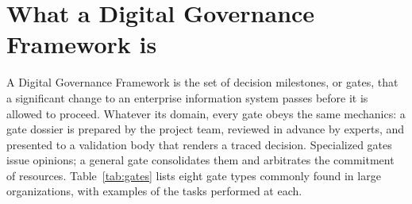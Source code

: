\section{What a Digital Governance Framework is}
\label{sec:dgf}

A Digital Governance Framework is the set of decision milestones, or gates, that a significant change
to an enterprise information system passes before it is allowed to proceed. Whatever its domain, every
gate obeys the same mechanics: a gate dossier is prepared by the project team, reviewed in advance by
experts, and presented to a validation body that renders a traced decision. Specialized gates issue
opinions; a general gate consolidates them and arbitrates the commitment of resources.
Table~\ref{tab:gates} lists eight gate types commonly found in large organizations, with examples of the
tasks performed at each.

